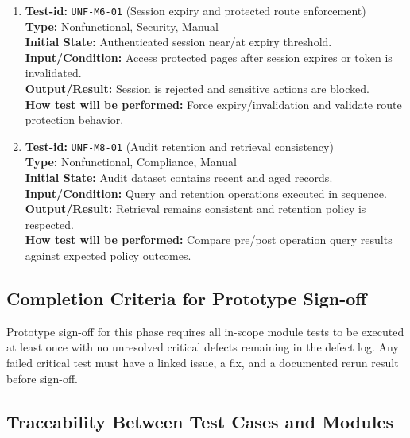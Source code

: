 \documentclass[12pt, titlepage]{article}
\begin{document}
\begin{enumerate}
\item \textbf{Test-id:} \texttt{UNF-M6-01} (Session expiry and protected route enforcement)\\
\textbf{Type:} Nonfunctional, Security, Manual\\
\textbf{Initial State:} Authenticated session near/at expiry threshold.\\
\textbf{Input/Condition:} Access protected pages after session expires or token is invalidated.\\
\textbf{Output/Result:} Session is rejected and sensitive actions are blocked.\\
\textbf{How test will be performed:} Force expiry/invalidation and validate route protection behavior.

\item \textbf{Test-id:} \texttt{UNF-M8-01} (Audit retention and retrieval consistency)\\
\textbf{Type:} Nonfunctional, Compliance, Manual\\
\textbf{Initial State:} Audit dataset contains recent and aged records.\\
\textbf{Input/Condition:} Query and retention operations executed in sequence.\\
\textbf{Output/Result:} Retrieval remains consistent and retention policy is respected.\\
\textbf{How test will be performed:} Compare pre/post operation query results against expected policy outcomes.

\end{enumerate}

\subsection{Completion Criteria for Prototype Sign-off}

Prototype sign-off for this phase requires all in-scope module tests to be
executed at least once with no unresolved critical defects remaining in the
defect log. Any failed critical test must have a linked issue, a fix, and a
documented rerun result before sign-off.

\subsection{Traceability Between Test Cases and Modules}
\end{document}
